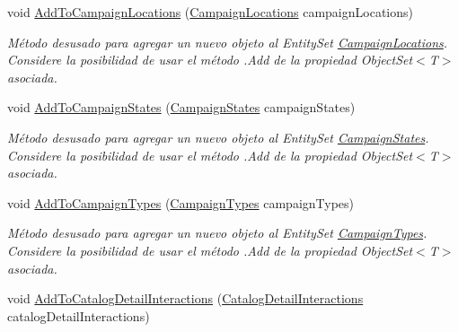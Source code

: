 \begin{DoxyCompactItemize}
void \hyperlink{class_microsoft_1_1_samples_1_1_kinect_1_1_basic_interactions_1_1_o_m_k_t_d_b_entities_aaf1d1bf2417d97b54aca23f8a2f1e8ed}{Add\-To\-Campaign\-Locations} (\hyperlink{class_microsoft_1_1_samples_1_1_kinect_1_1_basic_interactions_1_1_campaign_locations}{Campaign\-Locations} campaign\-Locations)
\begin{DoxyCompactList}\small\item\em Método desusado para agregar un nuevo objeto al Entity\-Set \hyperlink{class_microsoft_1_1_samples_1_1_kinect_1_1_basic_interactions_1_1_campaign_locations}{Campaign\-Locations}. Considere la posibilidad de usar el método .Add de la propiedad Object\-Set$<$T$>$ asociada. \end{DoxyCompactList}\item 
void \hyperlink{class_microsoft_1_1_samples_1_1_kinect_1_1_basic_interactions_1_1_o_m_k_t_d_b_entities_a171d39d92b1136d9b211a345f0218164}{Add\-To\-Campaign\-States} (\hyperlink{class_microsoft_1_1_samples_1_1_kinect_1_1_basic_interactions_1_1_campaign_states}{Campaign\-States} campaign\-States)
\begin{DoxyCompactList}\small\item\em Método desusado para agregar un nuevo objeto al Entity\-Set \hyperlink{class_microsoft_1_1_samples_1_1_kinect_1_1_basic_interactions_1_1_campaign_states}{Campaign\-States}. Considere la posibilidad de usar el método .Add de la propiedad Object\-Set$<$T$>$ asociada. \end{DoxyCompactList}\item 
void \hyperlink{class_microsoft_1_1_samples_1_1_kinect_1_1_basic_interactions_1_1_o_m_k_t_d_b_entities_a8f07081611c752fc2f6b3e4cdb605c6a}{Add\-To\-Campaign\-Types} (\hyperlink{class_microsoft_1_1_samples_1_1_kinect_1_1_basic_interactions_1_1_campaign_types}{Campaign\-Types} campaign\-Types)
\begin{DoxyCompactList}\small\item\em Método desusado para agregar un nuevo objeto al Entity\-Set \hyperlink{class_microsoft_1_1_samples_1_1_kinect_1_1_basic_interactions_1_1_campaign_types}{Campaign\-Types}. Considere la posibilidad de usar el método .Add de la propiedad Object\-Set$<$T$>$ asociada. \end{DoxyCompactList}\item 
void \hyperlink{class_microsoft_1_1_samples_1_1_kinect_1_1_basic_interactions_1_1_o_m_k_t_d_b_entities_a094726368ac1a521cfa7fc3f1ac3c662}{Add\-To\-Catalog\-Detail\-Interactions} (\hyperlink{class_microsoft_1_1_samples_1_1_kinect_1_1_basic_interactions_1_1_catalog_detail_interactions}{Catalog\-Detail\-Interactions} catalog\-Detail\-Interactions)

\end{DoxyCompactItemize}
